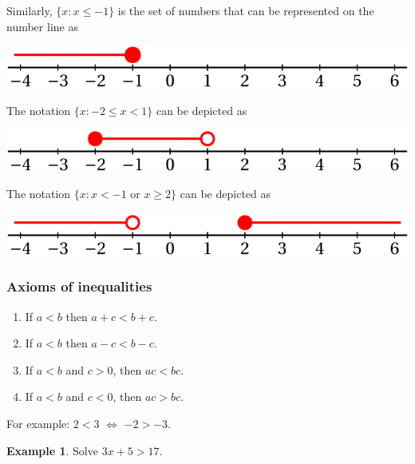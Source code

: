 \documentclass[
  12pt,
  oneside]{book}
\providecommand{\tightlist}{%
  \setlength{\itemsep}{0pt}\setlength{\parskip}{0pt}}
\theoremstyle{definition}
\theoremstyle{definition}
\newtheorem{example}{Example}[chapter]
\theoremstyle{definition}
\theoremstyle{definition}
\theoremstyle{remark}
\begin{document}
Similarly, \(\{x: x\leq -1\}\) is the set of numbers that can be represented on the number line as

\begin{center}\includegraphics{t04-numline3} \end{center}

The notation \(\{x: -2\leq x <1\}\) can be depicted as

\begin{center}\includegraphics{t04-numline4} \end{center}

The notation \(\{x: x<-1 \text{ or } x\geq2\}\) can be depicted as

\begin{center}\includegraphics{t04-numline5} \end{center}

\hypertarget{axioms-of-inequalities}{%
\subsubsection*{Axioms of inequalities}\label{axioms-of-inequalities}}

\begin{enumerate}
\def\labelenumi{\arabic{enumi}.}
\tightlist
\item
  If \(a<b\) then \(a+c<b+c\).
\item
  If \(a<b\) then \(a-c<b-c\).
\item
  If \(a<b\) and \(c>0\), then \(ac<bc\).
\item
  If \(a<b\) and \(c<0\), then \(ac>bc\).
\end{enumerate}

For example: \(2<3\) \(\iff\) \(-2>-3\).

\begin{example}
Solve \(3x+5>17\).
\end{example}
\end{document}
